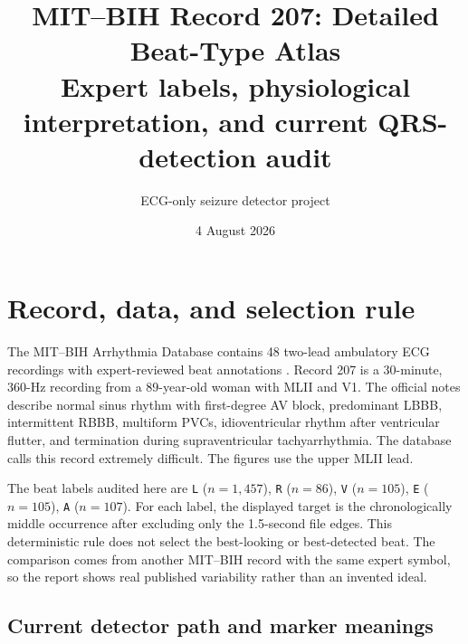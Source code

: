 \documentclass[11pt]{article}
\title{\textbf{MIT--BIH Record 207: Detailed Beat-Type Atlas}\\[0.35em]
        \large Expert labels, physiological interpretation, and current QRS-detection audit}
\author{ECG-only seizure detector project}
\date{4 August 2026}
\begin{document}
        \maketitle

        \begin{center}
        \end{center}

        \section{Record, data, and selection rule}

        The MIT--BIH Arrhythmia Database contains 48 two-lead ambulatory ECG recordings with expert-reviewed
        beat annotations \cite{goldberger2000physiobank,moody2001mitbih,physionetmitdb}. Record 207 is
        a 30-minute, 360-Hz recording from a 89-year-old woman with MLII and V1. The official notes describe normal sinus rhythm with first-degree AV block, predominant LBBB, intermittent RBBB, multiform PVCs, idioventricular rhythm after ventricular flutter, and termination during supraventricular tachyarrhythmia. The database calls this record extremely difficult. The figures use the upper MLII lead.

        The beat labels audited here are \texttt{L} ($n=1,457$), \texttt{R} ($n=86$), \texttt{V} ($n=105$), \texttt{E} ($n=105$), \texttt{A} ($n=107$). For each label, the displayed target is the chronologically
        middle occurrence after excluding only the 1.5-second file edges. This deterministic rule does not
        select the best-looking or best-detected beat. The comparison comes from another MIT--BIH record with
        the same expert symbol, so the report shows real published variability rather than an invented ideal.

        \subsection{Current detector path and marker meanings}
\end{document}
